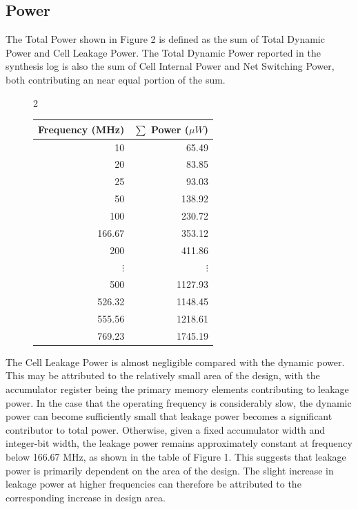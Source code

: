 \documentclass[a4paper,11pt]{article}
\begin{document}
\subsection{Power}

The Total Power shown in Figure 2 is defined as the sum of Total Dynamic Power and Cell Leakage Power. The Total Dynamic Power reported in the synthesis log is also the sum of Cell Internal Power and Net Switching Power, both contributing an near equal portion of the sum. 

\begin{figure}[htbp]
    \centering

    \begin{multicols}{2}

        \centering
        
        \label{fig:dynamic-power}

        \columnbreak

        \centering

        \begin{tabular}{rr}
            \toprule
            \textbf{Frequency (MHz)} & \textbf{$\sum$ Power ($\mu W$)} \\
            \midrule
            10     & 65.49 \\
            20     & 83.85 \\
            25     & 93.03 \\
            50     & 138.92 \\
            100    & 230.72 \\
            166.67 & 353.12 \\
            200    & 411.86 \\
            $\vdots$ & $\vdots$ \\
            500    & 1127.93 \\
            526.32 & 1148.45 \\
            555.56 & 1218.61 \\
            769.23 & 1745.19 \\
            \bottomrule
        \end{tabular}
    \end{multicols}
\end{figure}

The Cell Leakage Power is almost negligible compared with the dynamic power. This may be attributed to the relatively small area of the design, with the accumulator register being the primary memory elements contributing to leakage power. In the case that the operating frequency is considerably slow, the dynamic power can become sufficiently small that leakage power becomes a significant contributor to total power. Otherwise, given a fixed accumulator width and integer-bit width, the leakage power remains approximately constant at frequency below 166.67 MHz, as shown in the table of Figure 1. This suggests that leakage power is primarily dependent on the area of the design. The slight increase in leakage power at higher frequencies can therefore be attributed to the corresponding increase in design area.
\end{document}
